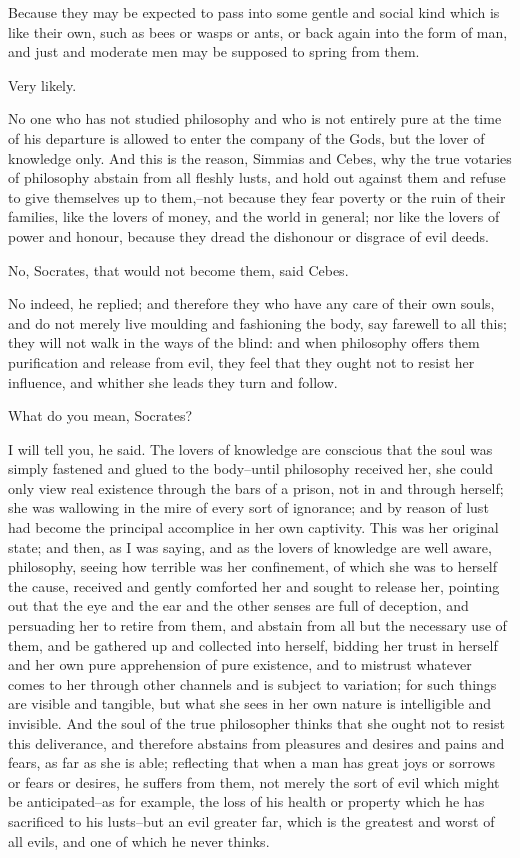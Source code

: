 Because they may be expected to pass into some gentle and social kind
which is like their own, such as bees or wasps or ants, or back again
into the form of man, and just and moderate men may be supposed to
spring from them.

Very likely.

No one who has not studied philosophy and who is not entirely pure at
the time of his departure is allowed to enter the company of the Gods,
but the lover of knowledge only. And this is the reason, Simmias and
Cebes, why the true votaries of philosophy abstain from all fleshly
lusts, and hold out against them and refuse to give themselves up to
them,--not because they fear poverty or the ruin of their families, like
the lovers of money, and the world in general; nor like the lovers of
power and honour, because they dread the dishonour or disgrace of evil
deeds.

No, Socrates, that would not become them, said Cebes.

No indeed, he replied; and therefore they who have any care of their
own souls, and do not merely live moulding and fashioning the body, say
farewell to all this; they will not walk in the ways of the blind: and
when philosophy offers them purification and release from evil, they
feel that they ought not to resist her influence, and whither she leads
they turn and follow.

What do you mean, Socrates?

I will tell you, he said. The lovers of knowledge are conscious that
the soul was simply fastened and glued to the body--until philosophy
received her, she could only view real existence through the bars of
a prison, not in and through herself; she was wallowing in the mire of
every sort of ignorance; and by reason of lust had become the principal
accomplice in her own captivity. This was her original state; and
then, as I was saying, and as the lovers of knowledge are well aware,
philosophy, seeing how terrible was her confinement, of which she was
to herself the cause, received and gently comforted her and sought to
release her, pointing out that the eye and the ear and the other senses
are full of deception, and persuading her to retire from them, and
abstain from all but the necessary use of them, and be gathered up and
collected into herself, bidding her trust in herself and her own pure
apprehension of pure existence, and to mistrust whatever comes to her
through other channels and is subject to variation; for such things
are visible and tangible, but what she sees in her own nature is
intelligible and invisible. And the soul of the true philosopher thinks
that she ought not to resist this deliverance, and therefore abstains
from pleasures and desires and pains and fears, as far as she is
able; reflecting that when a man has great joys or sorrows or fears or
desires, he suffers from them, not merely the sort of evil which might
be anticipated--as for example, the loss of his health or property which
he has sacrificed to his lusts--but an evil greater far, which is the
greatest and worst of all evils, and one of which he never thinks.

